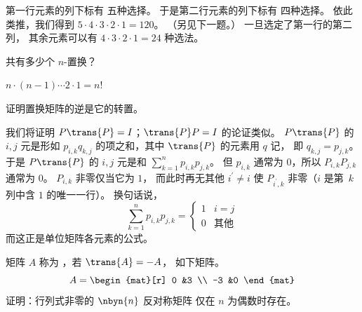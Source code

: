 \begin{exercises}
    \begin{answer}
      \begin{exparts}
        \partsitem 第一行元素的列下标有
          五种选择。
          于是第二行元素的列下标有
          四种选择。
          依此类推，我们得到 $5\cdot 4\cdot 3\cdot 2\cdot 1=120$。
          （另见下一题。）
        \partsitem 一旦选定了第一行的第二列，
          其余元素可以有 \( 4\cdot 3\cdot 2\cdot 1=24 \)
          种选法。
      \end{exparts}
    \end{answer}
  \item
    共有多少个 \( n \)-置换？
    \begin{answer}
       \( n\cdot(n-1)\cdots 2\cdot 1=n! \)
    \end{answer}
  \item 证明置换矩阵的逆是它的转置。
    \begin{answer}
      \cite{SchmidtSO}
      我们将证明 $P\trans{P}=I$；$\trans{P}P=I$ 的论证类似。
      $P\trans{P}$ 的 $i,j$ 元是形如
      $p_{i,k}q_{k,j}$ 的项之和，其中 $\trans{P}$ 的元素用 $q$ 记，
      即 $q_{k,j}=p_{j,k}$。
      于是 $P\trans{P}$ 的 $i,j$ 元是和
      \(
        \sum_{k=1}^n p_{i,k}p_{j,k}
      \)。
      但 $p_{i,k}$ 通常为 $0$，所以 $P_{i,k}P_{j,k}$ 通常为 $0$。
      $P_{i,k}$ 非零仅当它为 $1$，
      而此时再无其他 $i^\prime\neq i$ 使 $P_{i^\prime,k}$
      非零（$i$ 是第~$k$ 列中含 $1$ 的唯一一行）。
      换句话说，
      \begin{equation*}
        \sum_{k=1}^n p_{i,k}p_{j,k}=
        \begin{cases}
          1  &i=j  \\
          0  &\text{其他}
        \end{cases}
      \end{equation*}
      而这正是单位矩阵各元素的公式。
    \end{answer}
  \item
    矩阵 \( A \) 称为
    ，若 \( \trans{A}=-A \)，
    如下矩阵。
    \begin{equation*}
      A=\begin{mat}[r]
          0  &3  \\
         -3  &0
        \end{mat}
    \end{equation*}
    证明：行列式非零的 \( \nbyn{n} \) 反对称矩阵
    仅在 \( n \) 为偶数时存在。
    \begin{answer}

\end{answer}
\end{exercises}
